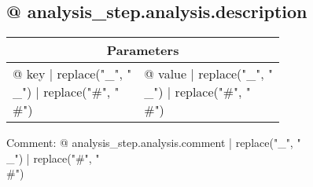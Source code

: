 \subsection{{@ analysis_step.analysis.description }}

\vspace*{1ex}
\begin{tabular}{ll}
\toprule
\multicolumn{2}{c}{\textbf{Parameters}}
\\
\midrule
{@ key | replace("_", "\\_") | replace("#", "\\#") } & {@ value | replace("_", "\\_") | replace("#", "\\#") }
\\
\bottomrule
\end{tabular}
\vspace*{1ex}

Comment: {@ analysis_step.analysis.comment | replace("_", "\\_") | replace("#", "\\#") }
